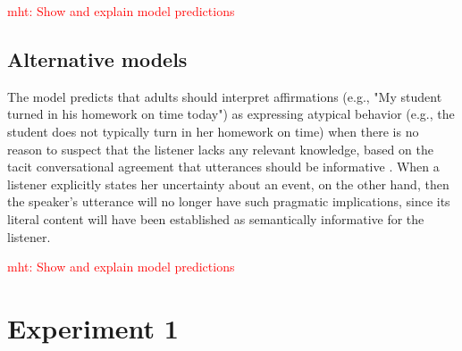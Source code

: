 \documentclass[10pt,letterpaper]{article}
\newcommand{\red}[1]{\textcolor{Red}{#1}}
\begin{document}
\red{mht: Show and explain model predictions}

\subsection{Alternative models}
The model predicts that adults should interpret affirmations (e.g., "My student turned in his homework on time today") as expressing atypical behavior (e.g., the student does not typically turn in her homework on time) when there is no reason to suspect that the listener lacks any relevant knowledge, based on the tacit conversational agreement that utterances should be informative \cite{Grice1975}.  When a listener explicitly states her uncertainty about an event, on the other hand, then the speaker's utterance will no longer have such pragmatic implications, since its literal content will have been established as semantically informative for the listener.

\red{mht: Show and explain model predictions}






\section{Experiment 1}
\end{document}
